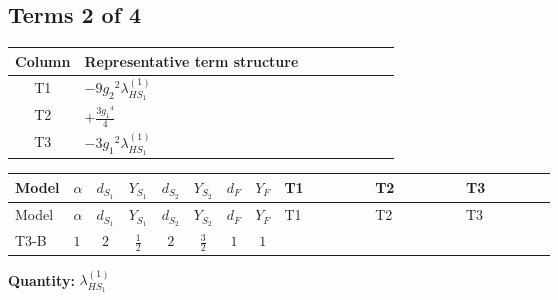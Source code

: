 \documentclass[8pt]{article}
\begin{document}
\begin{landscape}
\subsection*{Terms 2 of 4}
\begin{center}
\begin{tabular}{@{}c >{\raggedright\arraybackslash}p{0.82\linewidth}@{}}
\toprule
Column & Representative term structure \\
\midrule
T1 & \(\displaystyle -9 {g_2}^2 {\lambda_{HS_1}^{(1)}}\) \\
\midrule
T2 & \(\displaystyle +\frac{3 {g_1}^4}{4}\) \\
\midrule
T3 & \(\displaystyle -3 {g_1}^2 {\lambda_{HS_1}^{(1)}}\) \\
\midrule
\bottomrule
\end{tabular}
\end{center}
\smallskip
\tiny
\begin{longtable}{@{}llcccccc >{\raggedright\arraybackslash}p{0.21\linewidth} >{\raggedright\arraybackslash}p{0.21\linewidth} >{\raggedright\arraybackslash}p{0.21\linewidth}@{}}
\toprule
Model & $\alpha$ & $d_{S_1}$ & $Y_{S_1}$ & $d_{S_2}$ & $Y_{S_2}$ & $d_F$ & $Y_F$ & T1 & T2 & T3 \\
\midrule
\endfirsthead
\toprule
Model & $\alpha$ & $d_{S_1}$ & $Y_{S_1}$ & $d_{S_2}$ & $Y_{S_2}$ & $d_F$ & $Y_F$ & T1 & T2 & T3 \\
\midrule
\endhead
T3-B & $1$ & $2$ & $\frac{1}{2}$ & $2$ & $\frac{3}{2}$ & $1$ & $1$ & \scriptsize\adjustbox{max width=\linewidth}{$\begin{gathered} -9 {g_2}^2 {\lambda_{HS_1}^{(1)}}\end{gathered}$} & \scriptsize\adjustbox{max width=\linewidth}{$\begin{gathered} +\frac{3 {g_1}^4}{4}\end{gathered}$} & \scriptsize\adjustbox{max width=\linewidth}{$\begin{gathered} -3 {g_1}^2 {\lambda_{HS_1}^{(1)}}\end{gathered}$} \\
\midrule
\bottomrule
\end{longtable}
\clearpage
\noindent\textbf{Quantity: }$\lambda_{HS_1}^{(1)}$\par\smallskip

\end{landscape}
\end{document}
